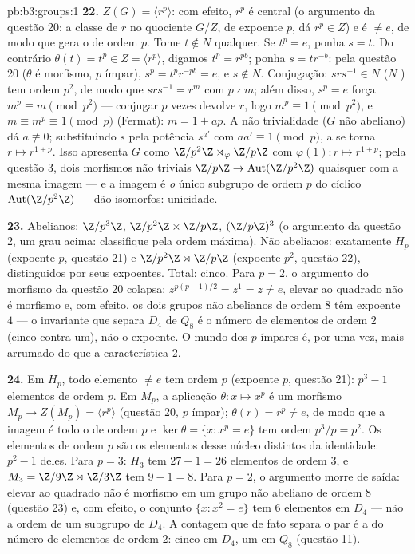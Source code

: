 \begin{solution}{pb:b3:groups:1}
\textbf{22.} $Z(G) = \langle r^p\rangle$: com efeito, $r^p$ é central (o argumento da
questão 20: a classe de $r$ no quociente $G/Z$, de expoente
$p$, dá $r^p \in Z$) e é $\neq e$, de modo que gera o  de ordem
$p$. Tome $t \notin N$ qualquer. Se $t^p = e$, ponha $s = t$. Do contrário
$\theta(t) = t^p \in Z =
\langle r^p\rangle$, digamos $t^p = r^{pb}$; ponha $s = tr^{-b}$: pela questão 20 ($\theta$ é
morfismo, $p$ ímpar), $s^p =
t^pr^{-pb} = e$, e $s \notin N$. Conjugação: $srs^{-1} \in
N$ ($N$
) tem ordem $p^2$, de modo que $srs^{-1} = r^m$ com $p
\nmid m$; além disso,
$s^p = e$ força $m^p \equiv m \pmod{p^2}$ --- conjugar $p$ vezes devolve $r$, logo $m^p \equiv 1 \pmod
{p^2}$,
e $m \equiv m^p \equiv 1 \pmod p$ (Fermat): $m = 1 +
ap$. A não trivialidade ($G$ não abeliano) dá
$a \not\equiv 0$; substituindo $s$ pela potência $s^{a'}$ com $aa' \equiv 1 \pmod p$, a 
se torna $r \mapsto r^{1+p}$. Isso apresenta $G$ como $\Z/p^2\Z\rtimes_\varphi\Z/p\Z$ com $\varphi(1)\colon r
\mapsto r^{1+p}$; pela questão
3, dois morfismos não triviais $\Z/p\Z \to \operatorname{Aut}(\Z/p^2\Z)$ quaisquer com a mesma imagem --- e
a imagem é \emph{o} único subgrupo de ordem $p$ do cíclico $\operatorname{Aut}(\Z/p^2\Z)$ ---
dão  isomorfos: unicidade.

\textbf{23.} Abelianos: $\Z/p^3\Z$, $\Z/p^2\Z\times\Z/p\Z$, $(\Z/p\Z)^3$ (o argumento da questão 2,
um grau acima: classifique pela ordem máxima). Não abelianos:
exatamente $H_p$ (expoente $p$, questão 21) e $\Z/p^2\Z\rtimes\Z/p\Z$ (expoente
$p^2$, questão 22), distinguidos por seus expoentes. Total: cinco.
Para $p = 2$, o argumento do morfismo da questão 20 colapsa: $z^{p(p-1)/2} = z^{1} = z \neq e$,
elevar ao quadrado não é morfismo e, com efeito, os dois grupos não
abelianos de ordem $8$ têm expoente $4$ --- o invariante que
separa $D_4$ de $Q_8$ é o número de elementos de ordem $2$
(cinco contra um), não o expoente. O mundo dos $p$ ímpares é, por uma
vez, mais arrumado do que a característica $2$.

\textbf{24.} Em $H_p$, todo elemento $\neq e$ tem ordem $p$
(expoente $p$, questão 21): $p^3 - 1$ elementos de ordem $p$. Em
$M_p$, a aplicação $\theta \colon x \mapsto x^p$ é um morfismo $M_p \to Z(M_p) = \langle r^p\rangle$ (questão 20, $p$
ímpar); $\theta(r) = r^p \neq e$, de modo que a imagem é todo o  de ordem $p$ e
$\ker\theta = \{x : x^p = e\}$ tem ordem $p^3/p =
p^2$. Os elementos de ordem $p$ são os elementos
desse núcleo distintos da identidade: $p^2 - 1$ deles. Para $p = 3$:
$H_3$ tem $27 - 1 = 26$ elementos de ordem $3$, e $M_3 = \Z/9\Z \rtimes
\Z/3\Z$ tem $9 - 1 = 8$. Para
$p = 2$, o argumento morre de saída: elevar ao quadrado não é
morfismo em um grupo não abeliano de ordem $8$ (questão 23) e, com
efeito, o conjunto $\{x : x^2 = e\}$ tem $6$ elementos em $D_4$ --- não a
ordem de um subgrupo de $D_4$. A contagem que de fato separa o par é
a do número de elementos de ordem $2$: cinco em $D_4$, um em
$Q_8$ (questão 11).


\end{solution}
